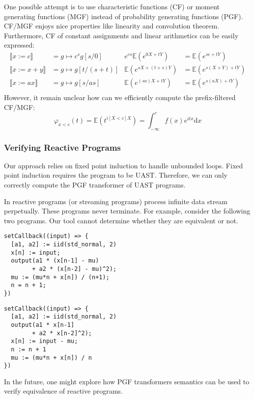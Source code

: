 \documentclass[a4paper]{article}
\renewcommand{\S}[1]{ \llbracket #1 \rrbracket }
\newcommand{\E}{ \mathbb{E} }
\begin{document}
One possible attempt is to use characteristic functions (CF) or moment generating functions (MGF) instead of probability generating functions (PGF).
CF/MGF enjoys nice properties like linearity and convolution theorem. Furthermore, CF of constant assignments and linear arithmetics can be easily expressed:
\begin{align*}
	\S{x:= c}   & = g\mapsto c^s g[s/0] & e^{cs} \E(e^{0X + tY}) & = \E(e^{sc + tY})     \\
	\S{x:= x+y} & = g\mapsto g[t/(s+t)] & \E(e^{sX + (t+s)Y})    & = \E(e^{s(X+Y) + tY}) \\
	\S{x:= ax}  & = g\mapsto g[s/as]    & \E(e^{(sa)X + tY})     & = \E(e^{s(aX) + tY})  \\
\end{align*}
However, it remain unclear how can we efficiently compute the prefix-filtered CF/MGF:
\[
	\varphi_{x<c}(t) = \E(t^{i[X<c]X}) = \int_{-\infty}^c f(x) e^{itx} \mathrm{d}x
\]

\subsubsection{Verifying Reactive Programs}

Our approach relies on fixed point induction to handle unbounded loops. Fixed point induction requires the program to be UAST.
Therefore, we can only correctly compute the PGF transformer of UAST programs.\par
In reactive programs (or streaming programs) process infinite data stream perpetually. These programs never terminate.
For example, consider the following two programs. Our tool cannot determine whether they are equivalent or not.

\noindent \begin{minipage}[t]{0.45\textwidth}
	\begin{tcolorbox}
		\begin{verbatim}
setCallback((input) => {
  [a1, a2] := iid(std_normal, 2)
  x[n] := input;
  output(a1 * (x[n-1] - mu)
        + a2 * (x[n-2] - mu)^2);
  mu := (mu*n + x[n]) / (n+1);
  n = n + 1;
})\end{verbatim}
	\end{tcolorbox}
\end{minipage}
\hspace{2ex}
\begin{minipage}[t]{0.45\textwidth}
	\begin{tcolorbox}
		\begin{verbatim}
setCallback((input) => {
  [a1, a2] := iid(std_normal, 2)
  output(a1 * x[n-1]
        + a2 * x[n-2]^2);
  x[n] := input - mu;
  n := n + 1
  mu := (mu*n + x[n]) / n
})\end{verbatim}
	\end{tcolorbox}
\end{minipage}

In the future, one might explore how PGF transformers semantics can be used to verify equivalence of reactive programs.

\appendix
\setlength{\parskip}{0pt}
\nocite{*}
\printbibliography
\end{document}
